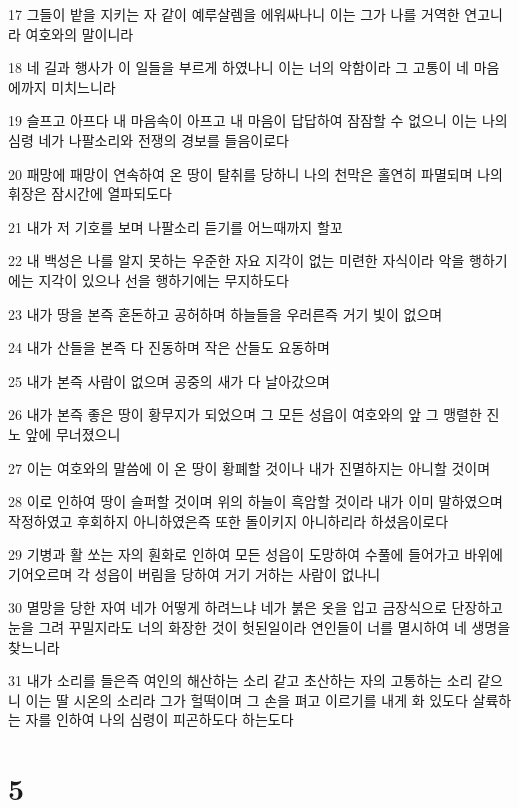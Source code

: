 \par 17 그들이 밭을 지키는 자 같이 예루살렘을 에워싸나니 이는 그가 나를 거역한 연고니라 여호와의 말이니라
\par 18 네 길과 행사가 이 일들을 부르게 하였나니 이는 너의 악함이라 그 고통이 네 마음에까지 미치느니라
\par 19 슬프고 아프다 내 마음속이 아프고 내 마음이 답답하여 잠잠할 수 없으니 이는 나의 심령 네가 나팔소리와 전쟁의 경보를 들음이로다
\par 20 패망에 패망이 연속하여 온 땅이 탈취를 당하니 나의 천막은 홀연히 파멸되며 나의 휘장은 잠시간에 열파되도다
\par 21 내가 저 기호를 보며 나팔소리 듣기를 어느때까지 할꼬
\par 22 내 백성은 나를 알지 못하는 우준한 자요 지각이 없는 미련한 자식이라 악을 행하기에는 지각이 있으나 선을 행하기에는 무지하도다
\par 23 내가 땅을 본즉 혼돈하고 공허하며 하늘들을 우러른즉 거기 빛이 없으며
\par 24 내가 산들을 본즉 다 진동하며 작은 산들도 요동하며
\par 25 내가 본즉 사람이 없으며 공중의 새가 다 날아갔으며
\par 26 내가 본즉 좋은 땅이 황무지가 되었으며 그 모든 성읍이 여호와의 앞 그 맹렬한 진노 앞에 무너졌으니
\par 27 이는 여호와의 말씀에 이 온 땅이 황폐할 것이나 내가 진멸하지는 아니할 것이며
\par 28 이로 인하여 땅이 슬퍼할 것이며 위의 하늘이 흑암할 것이라 내가 이미 말하였으며 작정하였고 후회하지 아니하였은즉 또한 돌이키지 아니하리라 하셨음이로다
\par 29 기병과 활 쏘는 자의 훤화로 인하여 모든 성읍이 도망하여 수풀에 들어가고 바위에 기어오르며 각 성읍이 버림을 당하여 거기 거하는 사람이 없나니
\par 30 멸망을 당한 자여 네가 어떻게 하려느냐 네가 붉은 옷을 입고 금장식으로 단장하고 눈을 그려 꾸밀지라도 너의 화장한 것이 헛된일이라 연인들이 너를 멸시하여 네 생명을 찾느니라
\par 31 내가 소리를 들은즉 여인의 해산하는 소리 같고 초산하는 자의 고통하는 소리 같으니 이는 딸 시온의 소리라 그가 헐떡이며 그 손을 펴고 이르기를 내게 화 있도다 살륙하는 자를 인하여 나의 심령이 피곤하도다 하는도다

\chapter{5}

